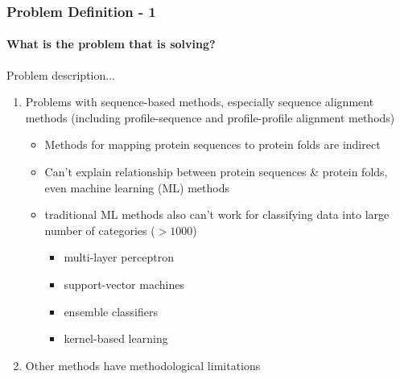 \documentclass[xcolor={usenames,dvipsnames},hyperref={hyperindex,bookmarks}]{beamer}
\begin{document}
\frame
{
	\frametitle{Problem Definition - 1}
	\framesubtitle{What is the problem that \cite{Hou2018} is solving?}

	Problem description...
	\begin{enumerate}
	\item Problems with sequence-based methods, especially sequence alignment methods (including profile-sequence and profile-profile alignment methods)  %
		\begin{itemize}
		\item Methods for mapping protein sequences to protein folds are indirect
		\item Can't explain relationship between protein sequences \& protein folds, even machine learning (ML) methods
		\item traditional ML methods also can't work for classifying data into large number of categories ($>1000$)
			\begin{itemize}
			\item multi-layer perceptron
			\item support-vector machines
			\item ensemble classifiers
			\item kernel-based learning
			\end{itemize}
		\end{itemize}
	\item Other methods have methodological limitations %
	\end{enumerate}

}
\end{document}
